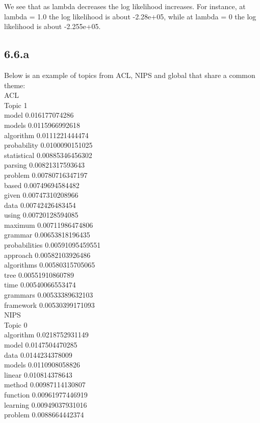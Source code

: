 \documentclass{article}
\begin{document}
We see that as lambda decreases the log likelihood
increases. For instance, at lambda = 1.0 the log likelihood is about -2.28e+05, while at lambda = 0 the log likelihood is about
-2.255e+05.

\subsection*{6.6.a}
Below is an example of topics from ACL, NIPS and global that share a common theme:\\
ACL\\
Topic 1\\
model 0.016177074286\\
models 0.0115966992618\\
algorithm 0.0111221444474\\
probability 0.0100090151025\\
statistical 0.00885346456302\\
parsing 0.00821317593643\\
problem 0.00780716347197\\
based 0.00749694584482\\
given 0.00747310208966\\
data 0.00742426483454\\
using 0.00720128594085\\
maximum 0.00711986474806\\
grammar 0.00653818196435\\
probabilities 0.00591095459551\\
approach 0.00582103926486\\
algorithms 0.00580315705065\\
tree 0.00551910860789\\
time 0.00540066553474\\
grammars 0.00533389632103\\
framework 0.00530399171093\\
NIPS\\
Topic 0\\
algorithm 0.0218752931149\\
model 0.0147504470285\\
data 0.0144234378009\\
models 0.0110908058826\\
linear 0.010814378643\\
method 0.00987114130807\\
function 0.00961977446919\\
learning 0.00949037931016\\
problem 0.0088664442374\\
\end{document}
